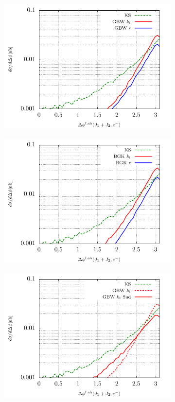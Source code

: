 \documentclass[a4,12pt]{article}
\begin{document}
\begin{figure}[p]
	\begin{subfigure}{0.5\textwidth}
		\includegraphics[width=\textwidth]{gnuplot/plotGBW1Lab} 
	\end{subfigure}
	\begin{subfigure}{0.5\textwidth}
		\includegraphics[width=\textwidth]{gnuplot/plotBGK1Lab} 
	\end{subfigure}
	\begin{subfigure}{0.5\textwidth}
		\includegraphics[width=\textwidth]{gnuplot/plotGBW2Lab}

\end{subfigure}
\end{figure}
\end{document}
